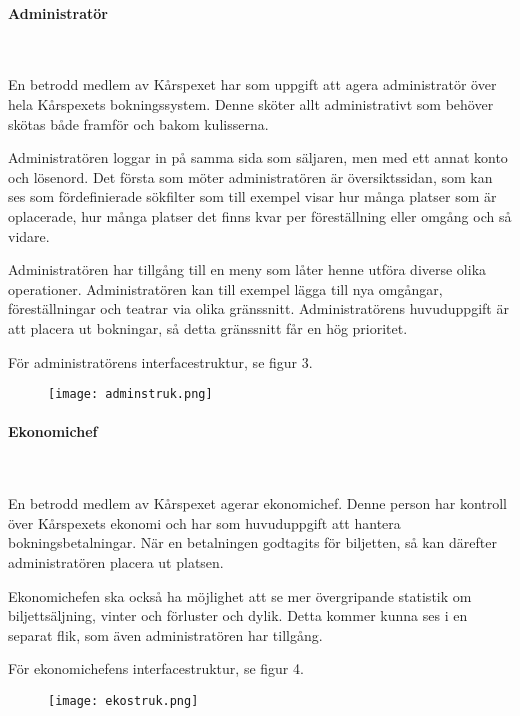 \documentclass[a4paper, twoside, 11pt, titlepage]{article}
\begin{document}
			\paragraph{Administratör}\

			En betrodd medlem av Kårspexet har som uppgift att agera administratör över hela Kårspexets bokningssystem. Denne sköter allt administrativt som behöver skötas både framför och bakom kulisserna. 

			Administratören loggar in på samma sida som säljaren, men med ett annat konto och lösenord. Det första som möter administratören är översiktssidan, som kan ses som fördefinierade sökfilter som till exempel visar hur många platser som är oplacerade, hur många platser det finns kvar per föreställning eller omgång och så vidare. 

			Administratören har tillgång till en meny som låter henne utföra diverse olika operationer. Administratören kan till exempel lägga till nya omgångar, föreställningar och teatrar via olika gränssnitt. Administratörens huvuduppgift är att placera ut bokningar, så detta gränssnitt får en hög prioritet.  

			För administratörens interfacestruktur, se figur 3.

			\begin{figure}[ht] \centering \texttt{[image: adminstruk.png]} \end{figure} \FloatBarrier

			\paragraph{Ekonomichef}\

			En betrodd medlem av Kårspexet agerar ekonomichef. Denne person har kontroll över Kårspexets ekonomi och har som huvuduppgift att hantera bokningsbetalningar. När en betalningen godtagits för biljetten, så kan därefter administratören placera ut platsen.

			Ekonomichefen ska också ha möjlighet att se mer övergripande statistik om biljettsäljning, vinter och förluster och dylik. Detta kommer kunna ses i en separat flik, som även administratören har tillgång.

			För ekonomichefens interfacestruktur, se figur 4.

			\begin{figure}[ht] \centering \texttt{[image: ekostruk.png]} \end{figure} \FloatBarrier
\end{document}
